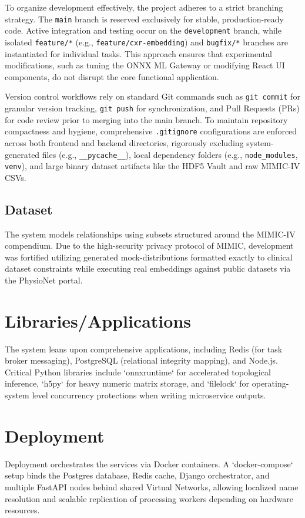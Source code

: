 \documentclass{fisatprojectfinal}
\begin{document}
To organize development effectively, the project adheres to a strict branching strategy. The \texttt{main} branch is reserved exclusively for stable, production-ready code. Active integration and testing occur on the \texttt{development} branch, while isolated \texttt{feature/*} (e.g., \texttt{feature/cxr-embedding}) and \texttt{bugfix/*} branches are instantiated for individual tasks. This approach ensures that experimental modifications, such as tuning the ONNX ML Gateway or modifying React UI components, do not disrupt the core functional application.

Version control workflows rely on standard Git commands such as \texttt{git commit} for granular version tracking, \texttt{git push} for synchronization, and Pull Requests (PRs) for code review prior to merging into the main branch. To maintain repository compactness and hygiene, comprehensive \texttt{.gitignore} configurations are enforced across both frontend and backend directories, rigorously excluding system-generated files (e.g., \texttt{\_\_pycache\_\_}), local dependency folders (e.g., \texttt{node\_modules}, \texttt{venv}), and large binary dataset artifacts like the HDF5 Vault and raw MIMIC-IV CSVs.

\subsection{Dataset}
The system models relationships using subsets structured around the MIMIC-IV compendium. Due to the high-security privacy protocol of MIMIC, development was fortified utilizing generated mock-distributions formatted exactly to clinical dataset constraints while executing real embeddings against public datasets via the PhysioNet portal.

\section{Libraries/Applications}
The system leans upon comprehensive applications, including Redis (for task broker messaging), PostgreSQL (relational integrity mapping), and Node.js. Critical Python libraries include `onnxruntime` for accelerated topological inference, `h5py` for heavy numeric matrix storage, and `filelock` for operating-system level concurrency protections when writing microservice outputs.

\section{Deployment}
Deployment orchestrates the services via Docker containers. A `docker-compose` setup binds the Postgres database, Redis cache, Django orchestrator, and multiple FastAPI nodes behind shared Virtual Networks, allowing localized name resolution and scalable replication of processing workers depending on hardware resources.
\end{document}

